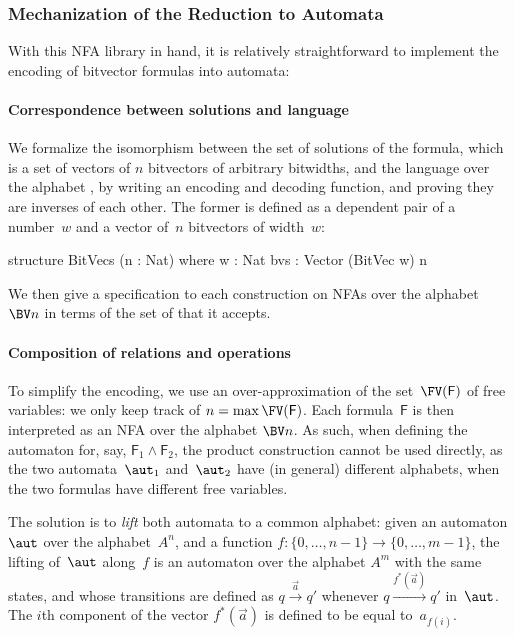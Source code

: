 \subsubsection{Mechanization of the Reduction to Automata}

With this NFA library in hand, it is relatively straightforward to implement the
encoding of bitvector formulas into automata:

\paragraph{Correspondence between solutions and language}

We formalize the isomorphism between the set of solutions of the
formula, which is a set of vectors of $n$ bitvectors of arbitrary bitwidths,
and the language over the alphabet , by writing an encoding
and decoding function, and proving they are inverses of each other.
%
The former is defined as a dependent pair of a number~$w$ and a vector of~$n$
bitvectors of width~$w$:
%
\begin{lean}
 structure BitVecs (n : Nat) where
  w : Nat
  bvs : Vector (BitVec w) n
\end{lean}
%
We then give a specification to each construction on NFAs over the alphabet~$\BV
n$ in terms of the set of  that it accepts.

\paragraph{Composition of relations and operations}

To simplify the encoding, we use an over-approximation of the set~$\FV(\mathsf
F)$ of free variables: we only keep track of $n = \max \FV(\mathsf F)$.
%
Each formula~$\textsf{F}$ is then interpreted as an NFA over the alphabet $\BV
n$. As such, when defining the automaton for, say, $\mathsf F_1 \land \mathsf
F_2$, the product construction cannot be used directly, as the two
automata~$\aut_1$ and~$\aut_2$ have (in general) different alphabets, when the
two formulas have different free variables.
%

The solution is to \emph{lift} both automata to a common alphabet: given an
automaton $\aut$ over the alphabet~$A^n$, and a function $f : \{0, \dots, n-1\}
\to \{0, \dots, m-1\}$, the lifting of~$\aut$ along~$f$ is an automaton over the
alphabet $A^m$ with the same states, and whose transitions are defined as $q
\xrightarrow{\vec{a}} q'$ whenever $q \xrightarrow{f^*(\vec{a})} q'$ in~$\aut$.
%
The $i$th component of the vector $f^*(\vec{a})$ is defined to be equal
to~$a_{f(i)}$.

